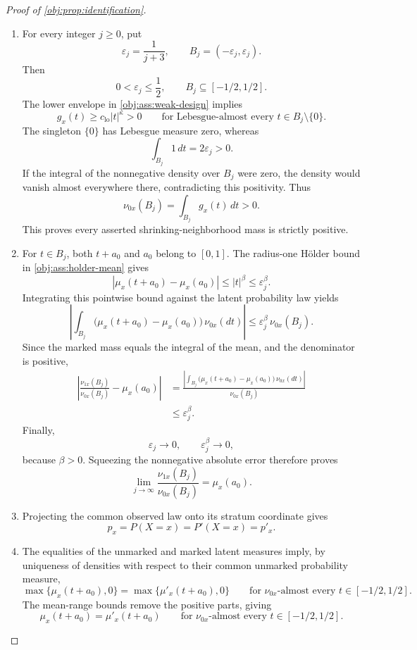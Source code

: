 \begin{proof}[Proof of \cref{obj:prop:identification}]
\begin{enumerate}
\item For every integer \(j\ge0\), put
\[
\varepsilon_j=\frac1{j+3},
\qquad
B_j=(-\varepsilon_j,\varepsilon_j).
\]
Then
\[
0<\varepsilon_j\le\frac12,
\qquad
B_j\subseteq[-1/2,1/2].
\]
The lower envelope in \cref{obj:ass:weak-design} implies
\[
g_x(t)\ge c_{\mathrm{lo}}|t|^\kappa>0
\qquad
\text{for Lebesgue-almost every }t\in B_j\setminus\{0\}.
\]
The singleton \(\{0\}\) has Lebesgue measure zero, whereas
\[
\int_{B_j}1\,dt=2\varepsilon_j>0.
\]
If the integral of the nonnegative density over \(B_j\) were zero, the density would vanish almost everywhere there, contradicting this positivity. Thus
\[
\nu_{0x}(B_j)=\int_{B_j}g_x(t)\,dt>0.
\]
This proves every asserted shrinking-neighborhood mass is strictly positive.

\item For \(t\in B_j\), both \(t+a_0\) and \(a_0\) belong to \([0,1]\). The radius-one Hölder bound in \cref{obj:ass:holder-mean} gives
\[
|\mu_x(t+a_0)-\mu_x(a_0)|
\le |t|^\beta
\le\varepsilon_j^\beta.
\]
Integrating this pointwise bound against the latent probability law yields
\[
\left|
\int_{B_j}\bigl(\mu_x(t+a_0)-\mu_x(a_0)\bigr)\,\nu_{0x}(dt)
\right|
\le\varepsilon_j^\beta\,\nu_{0x}(B_j).
\]
Since the marked mass equals the integral of the mean, and the denominator is positive,
\[
\begin{aligned}
\left|
\frac{\nu_{1x}(B_j)}{\nu_{0x}(B_j)}-\mu_x(a_0)
\right|
&=
\frac{
\left|\displaystyle\int_{B_j}
\bigl(\mu_x(t+a_0)-\mu_x(a_0)\bigr)\,\nu_{0x}(dt)\right|
}{\nu_{0x}(B_j)}\\
&\le\varepsilon_j^\beta.
\end{aligned}
\]
Finally,
\[
\varepsilon_j\longrightarrow0,
\qquad
\varepsilon_j^\beta\longrightarrow0,
\]
because \(\beta>0\). Squeezing the nonnegative absolute error therefore proves
\[
\lim_{j\to\infty}\frac{\nu_{1x}(B_j)}{\nu_{0x}(B_j)}
=\mu_x(a_0).
\]

\item Projecting the common observed law onto its stratum coordinate gives
\[
p_x=P(X=x)=P'(X=x)=p'_x.
\]

\item The equalities of the unmarked and marked latent measures imply, by uniqueness of densities with respect to their common unmarked probability measure,
\[
\max\{\mu_x(t+a_0),0\}
=\max\{\mu'_x(t+a_0),0\}
\qquad
\text{for }\nu_{0x}\text{-almost every }t\in[-1/2,1/2].
\]
The mean-range bounds remove the positive parts, giving
\[
\mu_x(t+a_0)=\mu'_x(t+a_0)
\qquad
\text{for }\nu_{0x}\text{-almost every }t\in[-1/2,1/2].
\]


\end{enumerate}
\end{proof}
